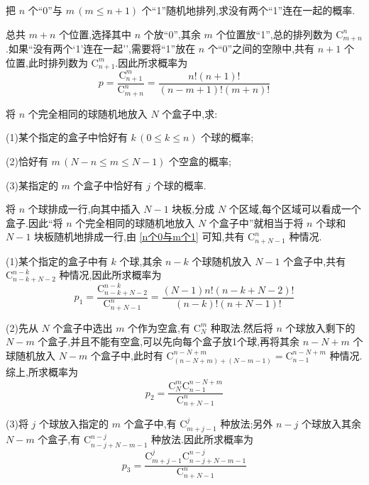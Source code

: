 \begin{solution}
\begin{figure}[H]

        \caption{}
        \label{fig:例题-接草成环问题}
    \end{figure}
\end{solution}

\question\label{n个0与m个1} 把 $n$ 个``0''与 $m \, (m \leqslant n+1)$ 个``1''随机地排列,求没有两个``1''连在一起的概率.

\begin{solution}
    总共 $m+n$ 个位置,选择其中 $n$ 个放``0'',其余 $m$ 个位置放``1'',总的排列数为 $\mathrm{C}_{m+n}^n$.如果``没有两个`1'连在一起'',需要将``1''放在 $n$ 个``0''之间的空隙中,共有 $n+1$ 个位置,此时排列数为 $\mathrm{C}_{n+1}^m$.因此所求概率为
    $$
    p = \dfrac{\mathrm{C}_{n+1}^m}{\mathrm{C}_{m+n}^n} = \dfrac{n! (n+1)!}{(n-m+1)! (m+n)!}
    $$
\end{solution}

\question[插板法] 将 $n$ 个完全相同的球随机地放入 $N$ 个盒子中,求:

(1)某个指定的盒子中恰好有 $k \, (0 \leqslant k \leqslant n)$ 个球的概率;

(2)恰好有 $m \, (N-n \leqslant m \leqslant N-1)$ 个空盒的概率;

(3)某指定的 $m$ 个盒子中恰好有 $j$ 个球的概率.

\begin{solution}
    将 $n$ 个球排成一行,向其中插入 $N-1$ 块板,分成 $N$ 个区域,每个区域可以看成一个盒子.因此``将 $n$ 个完全相同的球随机地放入 $N$ 个盒子中''就相当于将 $n$ 个球和 $N-1$ 块板随机地排成一行,由 \ref{n个0与m个1} 可知,共有 $\mathrm{C}_{n+N-1}^n$ 种情况.

    (1)某个指定的盒子中有 $k$ 个球,其余 $n-k$ 个球随机放入 $N-1$ 个盒子中,共有 $\mathrm{C}_{n-k+N-2}^{n-k}$ 种情况,因此所求概率为
    $$
    p_1 = \dfrac{\mathrm{C}_{n-k+N-2}^{n-k}}{\mathrm{C}_{n+N-1}^n} = \dfrac{(N-1) n! (n-k+N-2)!}{(n-k)! (n+N-1)!}
    $$

    (2)先从 $N$ 个盒子中选出 $m$ 个作为空盒,有 $\mathrm{C}_N^m$ 种取法.然后将 $n$ 个球放入剩下的 $N-m$ 个盒子,并且不能有空盒,可以先向每个盒子放1个球,再将其余 $n-N+m$ 个球随机放入 $N-m$ 个盒子中,此时有 $\mathrm{C}_{(n-N+m)+(N-m-1)}^{n-N+m} = \mathrm{C}_{n-1}^{n-N+m}$ 种情况.综上,所求概率为
    $$
    p_2 = \dfrac{\mathrm{C}_N^m \mathrm{C}_{n-1}^{n-N+m}}{\mathrm{C}_{n+N-1}^n}
    $$

    (3)将 $j$ 个球放入指定的 $m$ 个盒子中,有 $\mathrm{C}_{m+j-1}^j$ 种放法;另外 $n-j$ 个球放入其余 $N-m$ 个盒子,有 $\mathrm{C}_{n-j+N-m-1}^{n-j}$ 种放法.因此所求概率为
    $$
    p_3 = \dfrac{\mathrm{C}_{m+j-1}^j \mathrm{C}_{n-j+N-m-1}^{n-j}}{\mathrm{C}_{n+N-1}^n}
    $$
\end{solution}

